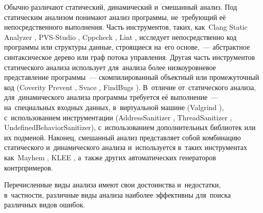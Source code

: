 Обычно различают статический, динамический и~смешанный анализ. Под статическим анализом понимают анализ программы, не~требующий её непосредственного выполнения. Часть инструментов, таких, как~Clang Static Analyzer \cite{csa}, PVS-Studio \cite{pvs}, Cppcheck \cite{cppcheck}, Lint \cite{lint}, исследует непосредственно код программы или структуры данные, строящиеся на~его основе,~--- абстрактное синтаксическое дерево или граф потока управления. Другая часть инструментов статического анализа использует для~анализа более низкоуровневое представление программы~--- скомпилированный объектный или промежуточный код (Coverity Prevent \cite{coverity}, Svace \cite{svace}, FindBugs \cite{findbugs}). В~отличие от~статического анализа, для~динамического анализа программы требуется её выполнение~--- на~специальных входных данных, в~виртуальной машине (Valgrind \cite{valgrind}), с~использованием инструментации (AddressSanitizer \cite{asan}, ThreadSanitizer \cite{tsan}, UndefinedBehaviorSanitizer), с~использованием дополнительных библиотек или их подменой. Наконец, смешанный анализ представляет собой комбинацию статического и~динамического анализа и~используется в~таких инструментах как~Mayhem \cite{mayhem}, KLEE \cite{klee}, а~также других автоматических генераторов контрпримеров.

Перечисленные виды анализа имеют свои достоинства и~недостатки, в~частности, различные виды анализа наиболее эффективны для~поиска различных видов ошибок.

